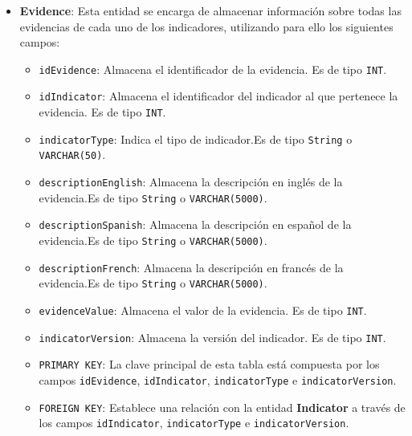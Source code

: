 \begin{itemize}
    \item \textbf{Evidence}: Esta entidad se encarga de almacenar información sobre todas las evidencias de cada uno de los indicadores, utilizando para ello los siguientes campos:
        \begin{itemize}
        \item \texttt{idEvidence}: Almacena el identificador de la evidencia. Es de tipo \texttt{INT}.
        \item \texttt{idIndicator}: Almacena el identificador del indicador al que pertenece la evidencia. Es de tipo \texttt{INT}.
        \item \texttt{indicatorType}: Indica el tipo de indicador.Es de tipo \texttt{String} o \texttt{VARCHAR(50)}.
        \item \texttt{descriptionEnglish}: Almacena la descripción en inglés de la evidencia.Es de tipo \texttt{String} o \texttt{VARCHAR(5000)}.
        \item \texttt{descriptionSpanish}: Almacena la descripción en español de la evidencia.Es de tipo \texttt{String} o \texttt{VARCHAR(5000)}.
        \item \texttt{descriptionFrench}: Almacena la descripción en francés de la evidencia.Es de tipo \texttt{String} o \texttt{VARCHAR(5000)}.
        \item \texttt{evidenceValue}: Almacena el valor de la evidencia. Es de tipo \texttt{INT}.
        \item \texttt{indicatorVersion}: Almacena la versión del indicador. Es de tipo \texttt{INT}.
        \item \texttt{PRIMARY KEY}: La clave principal de esta tabla está compuesta por los campos \texttt{idEvidence}, \texttt{idIndicator}, \texttt{indicatorType} e \texttt{indicatorVersion}.
        \item \texttt{FOREIGN KEY}: Establece una relación con la entidad \textbf{Indicator} a través de los campos \texttt{idIndicator}, \texttt{indicatorType} e \texttt{indicatorVersion}.
        \end{itemize}
        


\end{itemize}
